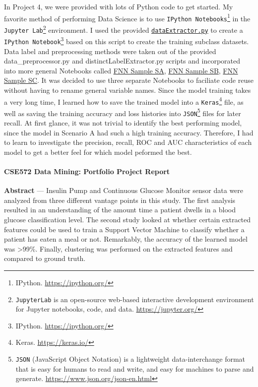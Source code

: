 In Project 4, we were provided with lots of Python code to get started.  My favorite method of performing Data Science is to use \texttt{IPython Notebooks}\footnote{IPython. \href{https://ipython.org/}{https://ipython.org/}} in the \texttt{Jupyter Lab}\footnote{\texttt{JupyterLab} is an open-source web-based interactive development environment for Jupyter notebooks, code, and data. \href{https://jupyter.org/}{https://jupyter.org/}} environment.  I used the provided \href{/sections/mcs-projects/mcs-portfolio-project/dataextractor}{\texttt{dataExtractor.py}} to create a \texttt{IPython Notebook}\footnote{IPython. \href{https://ipython.org/}{https://ipython.org/}} based on this script to create the training subclass datasets.  Data label and preprocessing methods were taken out of the provided data\_preprocessor.py and distinctLabelExtractor.py scripts and incorporated into more general Notebooks called \href{/sections/mcs-projects/mcs-portfolio-project/fnn-sample-sa}{FNN Sample SA}, \href{/sections/mcs-projects/mcs-portfolio-project/fnn-sample-sb}{FNN Sample SB}, \href{/sections/mcs-projects/mcs-portfolio-project/fnn-sample-sc}{FNN Sample SC}.  It was decided to use three separate Notebooks to faciliate code reuse without having to rename general variable names.
Since the model training takes a very long time, I learned how to save the trained model into a \texttt{Keras}\footnote{Keras. \url{https://keras.io/}} file, as well as saving the training accuracy and loss histories into \texttt{JSON}\footnote{\texttt{JSON} (JavaScript Object Notation) is a lightweight data-interchange format that is easy for humans to read and write, and easy for machines to parse and generate. \href{https://www.json.org/json-en.html}{https://www.json.org/json-en.html}} files for later recall.  At first glance, it was not trivial to identify the best performing model, since the model in Scenario A had such a high training accuracy.  Therefore, I had to learn to investigate the precision, recall, ROC and AUC characteristics of each model to get a better feel for which model peformed the best.

\paragraph{CSE572 Data Mining: Portfolio Project Report}

\textbf{Abstract} --- Insulin Pump and Continuous Glucose Monitor sensor data were analyzed from three different vantage points in this study.  The first analysis resulted in an understanding of the amount time a patient dwells in a blood glucose classification level.  The second study looked at whether certain extracted features could be used to train a Support Vector Machine to classify whether a patient has eaten a meal or not.  Remarkably, the accuracy of the learned model was \textgreater  99\%.  Finally, clustering was performed on the extracted features and compared to ground truth.

